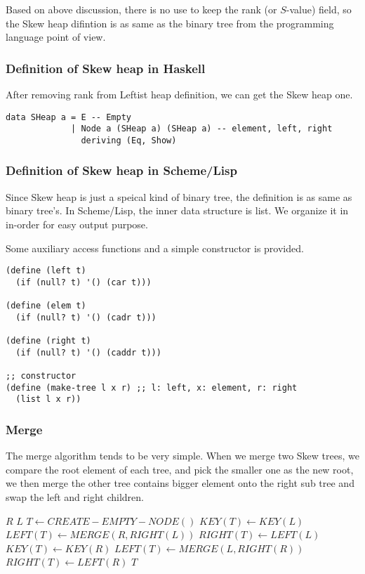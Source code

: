 \documentclass{article}
\begin{document}
Based on above discussion, there is no use to keep the rank (or $S$-value)
field, so the Skew heap difintion is as same as the binary tree from the
programming language point of view.

\subsubsection*{Definition of Skew heap in Haskell}

After removing rank from Leftist heap definition, we can get the Skew
heap one.

\lstset{language=Haskell}
\begin{lstlisting}
data SHeap a = E -- Empty 
             | Node a (SHeap a) (SHeap a) -- element, left, right
               deriving (Eq, Show)
\end{lstlisting}

\subsubsection*{Definition of Skew heap in Scheme/Lisp}

Since Skew heap is just a speical kind of binary tree, the definition is
as same as binary tree's. In Scheme/Lisp, the inner data structure is
list. We organize it in in-order for easy output purpose.

Some auxiliary access functions and a simple constructor is provided.

\lstset{language = lisp}
\begin{lstlisting}
(define (left t)
  (if (null? t) '() (car t)))

(define (elem t)
  (if (null? t) '() (cadr t)))

(define (right t)
  (if (null? t) '() (caddr t)))

;; constructor
(define (make-tree l x r) ;; l: left, x: element, r: right
  (list l x r))
\end{lstlisting}

\subsubsection{Merge}

The merge algorithm tends to be very simple. When we merge two Skew
trees, we compare the root element of each tree, and pick the smaller
one as the new root, we then merge the other tree contains bigger
element onto the right sub tree and swap the left and right children.

\begin{algorithmic}[1]
    \State \Return $R$
    \State \Return $L$
  \Else
    \State $T \gets CREATE-EMPTY-NODE()$
      \State $KEY(T) \gets KEY(L)$
      \State $LEFT(T) \gets MERGE(R, RIGHT(L))$
      \State $RIGHT(T) \gets LEFT(L)$
    \Else
      \State $KEY(T) \gets KEY(R)$
      \State $LEFT(T) \gets MERGE(L, RIGHT(R))$
      \State $RIGHT(T) \gets LEFT(R)$
    \EndIf
    \State \Return $T$
  \EndIf
\EndFunction
\end{algorithmic}
\end{document}
